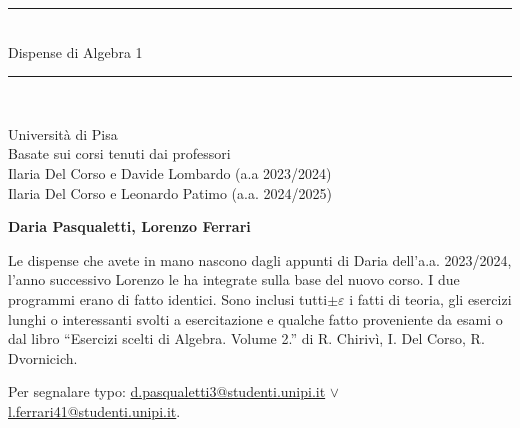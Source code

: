 \documentclass[10pt]{article}
\newcommand{\HRule}[1]{\rule{\linewidth}{#1}}
\theoremstyle{plain}
\begin{document}
\def\changemargin#1#2{\list{}{\rightmargin#2\leftmargin#1}\item[]}
\let\endchangemargin=\endlist
\begin{titlepage}
    \begin{center}
        {\bfseries
        \textbf{}
        \vspace{2.0cm}
        
		{ \LARGE
        \HRule{1.5pt} \\
		Dispense di Algebra 1
		\HRule{2.0pt} \\
        }
        
        \large
        \vspace{0.6cm} Università di Pisa \\
        \vspace{0.6cm} Basate sui corsi tenuti dai professori \\ 
        Ilaria Del Corso e Davide Lombardo (a.a 2023/2024)\\
        Ilaria Del Corso e Leonardo Patimo (a.a. 2024/2025)
        }
		 \vspace*{7\baselineskip} 


        \vfill
        { \large \textbf{Daria Pasqualetti, Lorenzo Ferrari} }

        \vspace{0.8cm}

        {\normalsize Le dispense che avete in mano nascono dagli appunti di Daria dell'a.a. 2023/2024, l'anno successivo Lorenzo le ha integrate sulla base del nuovo corso. I due programmi erano di fatto identici.
        Sono inclusi tutti$\pm \varepsilon$ i fatti di teoria, gli esercizi lunghi o interessanti svolti a esercitazione e qualche fatto proveniente da esami o dal libro ``Esercizi scelti di Algebra. Volume 2.'' di  R. Chirivì, I. Del Corso, R. Dvornicich.

        \smallbreak
        Per segnalare typo:
        \href{mailto:d.pasqualetti3@studenti.unipi.it}{d.pasqualetti3@studenti.unipi.it}
        $ \lor $
        \href{mailto:l.ferrari41@studenti.unipi.it}{l.ferrari41@studenti.unipi.it}.}
    \end{center}
\end{titlepage}

\tableofcontents
\newpage



\newpage

\newpage

\end{document}
